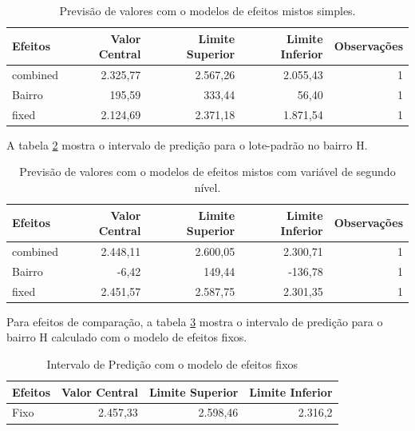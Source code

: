 \documentclass[
  a4paper, 11pt]{article}
\begin{document}
\begin{table}

\caption{\label{tab:pred1}Previsão de valores com o modelos de efeitos mistos simples.}
\centering
\begin{tabular}[t]{lrrrr}
\toprule
Efeitos & Valor Central & Limite Superior & Limite Inferior & Observações\\
\midrule
\rowcolor{gray!6}  combined & 2.325,77 & 2.567,26 & 2.055,43 & 1\\
Bairro & 195,59 & 333,44 & 56,40 & 1\\
\rowcolor{gray!6}  fixed & 2.124,69 & 2.371,18 & 1.871,54 & 1\\
\bottomrule
\end{tabular}
\end{table}

A tabela \ref{tab:pred2} mostra o intervalo de predição para o
lote-padrão no bairro H.

\begin{table}

\caption{\label{tab:pred2}Previsão de valores com o modelos de efeitos mistos com variável de segundo nível.}
\centering
\begin{tabular}[t]{lrrrr}
\toprule
Efeitos & Valor Central & Limite Superior & Limite Inferior & Observações\\
\midrule
\rowcolor{gray!6}  combined & 2.448,11 & 2.600,05 & 2.300,71 & 1\\
Bairro & -6,42 & 149,44 & -136,78 & 1\\
\rowcolor{gray!6}  fixed & 2.451,57 & 2.587,75 & 2.301,35 & 1\\
\bottomrule
\end{tabular}
\end{table}

Para efeitos de comparação, a tabela \ref{tab:pred3} mostra o intervalo
de predição para o bairro H calculado com o modelo de efeitos fixos.

\begin{table}

\caption{\label{tab:pred3}Intervalo de Predição com o modelo de efeitos fixos}
\centering
\begin{tabular}[t]{lrrr}
\toprule
Efeitos & Valor Central & Limite Superior & Limite Inferior\\
\midrule
\rowcolor{gray!6}  Fixo & 2.457,33 & 2.598,46 & 2.316,2\\
\bottomrule
\end{tabular}
\end{table}
\end{document}
